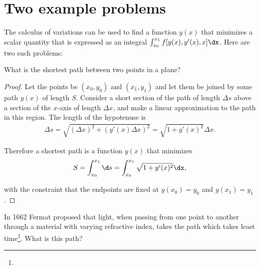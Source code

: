 
\section{Two example problems}
The calculus of variations can be used to find a function $y(x)$ that minimizes a scalar quantity
that is expressed as an integral $\int_{x_0}^{x_1} f[y(x), y'(x), x] \dx$. Here are two such
problems:

\begin{question*}
  What is the shortest path between two points in a plane?
\end{question*}

\begin{proof}
  Let the points be $(x_0, y_0)$ and $(x_1, y_1)$ and let them be joined by some path $y(x)$ of
  length $S$. Consider a short section of the path of length $\Delta s$ above a section of the
  $x$-axis of length $\Delta x$, and make a linear approximation to the path in this region. The
  length of the hypotenuse is
  \begin{align*}
    \Delta s = \sqrt{(\Delta x)^2 + (y'(x)\Delta x)^2} = \sqrt{1 + y'(x)^2} \Delta x.
  \end{align*}

  Therefore a shortest path is a function $y(x)$ that minimizes
  \begin{align*}
    S = \int_{x_0}^{x_1} \d s = \int_{x_0}^{x_1} \sqrt{1 + y'(x)^2} \dx,
  \end{align*}

  with the constraint that the endpoints are fixed at $y(x_0) = y_0$ and $y(x_1) = y_1$.

\end{proof}


\begin{question*}
  In 1662 Fermat proposed that light, when passing from one point to another through a material with
  varying refractive index, takes the path which takes least time\footnote{}. What
  is this path?
\end{question*}

